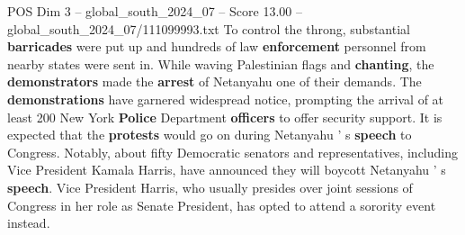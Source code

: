 \begin{textsample}{POS Dim 3 – global\_south\_2024\_07 – Score 13.00 – global\_south\_2024\_07/111099993.txt}
To control the throng, substantial \textbf{barricades} were put up and hundreds of law \textbf{enforcement} personnel from nearby states were sent in.
While waving Palestinian flags and \textbf{chanting}, the \textbf{demonstrators} made the \textbf{arrest} of Netanyahu one of their demands.
The \textbf{demonstrations} have garnered widespread notice, prompting the arrival of at least 200 New York \textbf{Police} Department \textbf{officers} to offer security support.
It is expected that the \textbf{protests} would go on during Netanyahu ' s \textbf{speech} to Congress.
Notably, about fifty Democratic senators and representatives, including Vice President Kamala Harris, have announced they will boycott Netanyahu ' s \textbf{speech}.
Vice President Harris, who usually presides over joint sessions of Congress in her role as Senate President, has opted to attend a sorority event instead.

\end{textsample}

